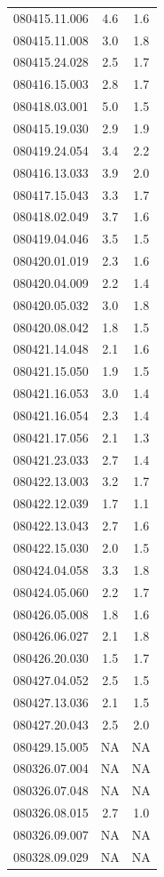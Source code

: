 \documentclass[draft]{agujournal2019}
\begin{document}
\begin{center}
\begin{longtable}{c c c}
080415.11.006 & 4.6 & 1.6 \\
080415.11.008 & 3.0 & 1.8 \\
080415.24.028 & 2.5 & 1.7 \\
080416.15.003 & 2.8 & 1.7 \\
080418.03.001 & 5.0 & 1.5 \\
080415.19.030 & 2.9 & 1.9 \\
080419.24.054 & 3.4 & 2.2 \\
080416.13.033 & 3.9 & 2.0 \\
080417.15.043 & 3.3 & 1.7 \\
080418.02.049 & 3.7 & 1.6 \\
080419.04.046 & 3.5 & 1.5 \\
080420.01.019 & 2.3 & 1.6 \\
080420.04.009 & 2.2 & 1.4 \\
080420.05.032 & 3.0 & 1.8 \\
080420.08.042 & 1.8 & 1.5 \\
080421.14.048 & 2.1 & 1.6 \\
080421.15.050 & 1.9 & 1.5 \\
080421.16.053 & 3.0 & 1.4 \\
080421.16.054 & 2.3 & 1.4 \\
080421.17.056 & 2.1 & 1.3 \\
080421.23.033 & 2.7 & 1.4 \\
080422.13.003 & 3.2 & 1.7 \\
080422.12.039 & 1.7 & 1.1 \\
080422.13.043 & 2.7 & 1.6 \\
080422.15.030 & 2.0 & 1.5 \\
080424.04.058 & 3.3 & 1.8 \\
080424.05.060 & 2.2 & 1.7 \\
080426.05.008 & 1.8 & 1.6 \\
080426.06.027 & 2.1 & 1.8 \\
080426.20.030 & 1.5 & 1.7 \\
080427.04.052 & 2.5 & 1.5 \\
080427.13.036 & 2.1 & 1.5 \\
080427.20.043 & 2.5 & 2.0 \\
080429.15.005 & NA & NA \\
080326.07.004 & NA & NA \\
080326.07.048 & NA & NA \\
080326.08.015 & 2.7 & 1.0 \\
080326.09.007 & NA & NA \\
080328.09.029 & NA & NA \\
\hline
\end{longtable}
\end{center}
\end{document}
